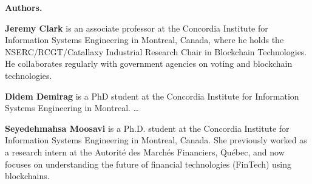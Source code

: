 \documentclass[acmlarge,screen]{acmart}
\begin{document}
\begin{Sidebar*}[h!]
\begin{framed}
\begin{flushleft}
\textbf{Authors.} \newline

\textbf{Jeremy Clark} is an associate professor at the Concordia Institute for Information Systems Engineering in Montreal, Canada, where he holds the NSERC/RCGT/Catallaxy Industrial Research Chair in Blockchain Technologies. He collaborates regularly with government agencies on voting and blockchain technologies. \newline

\textbf{Didem Demirag} is a PhD student at the Concordia Institute for Information Systems Engineering in Montreal. \ldots \newline

\textbf{Seyedehmahsa Moosavi} is a Ph.D. student at the Concordia Institute for Information Systems Engineering in Montreal, Canada. She previously worked as a research intern at the Autorité des Marchés Financiers, Québec, and now focuses on understanding the future of financial technologies (FinTech) using blockchains. \newline

\end{flushleft}
\end{framed}
\end{Sidebar*}



\end{document}

